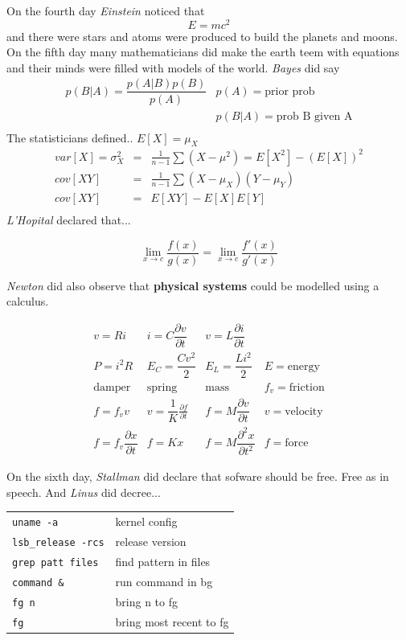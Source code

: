 \documentclass[a4paper,12pt]{article}
\begin{document}
\begin{multicols}{2}
On the fourth day \emph{Einstein} noticed that
\[ E=mc^2 \]
and there were stars and atoms were produced to build the planets and moons.
\vfill
On the fifth day many mathematicians did make the earth teem with equations and
their minds were filled with models of the world.
\vfill
\emph{Bayes} did say \ \ 
\[
\begin{array}{ll}
p(B|A) = \dfrac{p(A|B)p(B)}{p(A)}&p(A)=\mbox{prior prob}\\
&p(B|A)=\mbox{prob B given A}\\
\end{array}
\]
\vfill
The statisticians defined.. $E[X]=\mu_X$
\[
\begin{array}{rcl}
var[X]=\sigma_X^2&=&\frac{1}{n-1}\sum (X-\mu^2)=E[X^2]-(E[X])^2\\
cov[XY]&=&\frac{1}{n-1}\sum(X-\mu_X)(Y-\mu_Y)\\
cov[XY]&=&E[XY]-E[X]E[Y]\\
\end{array}
\]
\vfill
\emph{L'Hopital} declared that...

\[\mathop {\lim }\limits_{x \to c} \frac{{f\left( x \right)}}{{g\left( x
\right)}} = \mathop {\lim }\limits_{x \to c} \frac{{f'\left( x
\right)}}{{g'\left( x \right)}}\]


\vfill
\emph{Newton} did  also observe that \textbf{physical systems} could be
modelled using a calculus.

\[
\begin{array}{cccl}
v = Ri&i = C\dfrac{\partial v}{\partial t}&v = L\dfrac{\partial i}{\partial
t}\\

P = i^2R & E_C = \dfrac{Cv^2}{2} & E_L = \dfrac{Li^2}{2}& E = \mbox{energy}\\

\mbox{damper}&\mbox{spring}&\mbox{mass}&f_v = \mbox{friction}\\
f = f_v v   & v = \dfrac{1}{K}\frac{\partial f}{\partial t}&f =
M\dfrac{\partial v}{\partial t}&v = \mbox{velocity}\\ f = f_v\dfrac{\partial
x}{\partial t}    &   f=Kx    & f = M \dfrac{\partial^2 x}{\partial t^2}&f =
\mbox{force}
\end{array}
\]

\columnbreak

On the sixth day, \emph{Stallman} did declare that sofware should be free. Free as in
speech. And \emph{Linus} did decree...

\begin{tabular}{ll}
\texttt{uname -a}& kernel config\\
\texttt{lsb\_release -rcs}& release version\\
\texttt{grep patt files}& find pattern in files\\
\texttt{command \&}& run command in bg\\
\texttt{fg n}& bring n to fg\\
\texttt{fg}& bring most recent to fg\\
\end{tabular}


\end{multicols}
\end{document}
